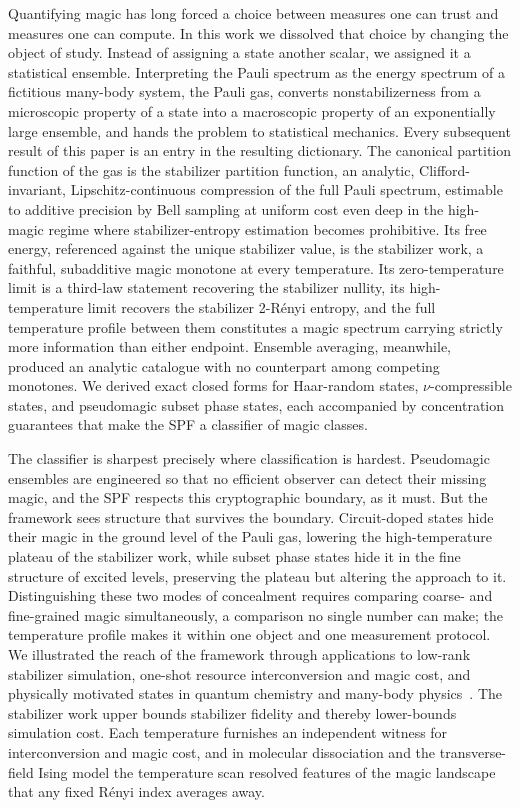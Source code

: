 \documentclass[aps,pra,superscriptaddress,twocolumn,longbibliography]{revtex4-2}
\begin{document}
Quantifying magic has long forced a choice between measures one can trust and measures one can compute. In this work we dissolved that choice by changing the object of study.
Instead of assigning a state another scalar, we assigned it a statistical ensemble. 
Interpreting the Pauli spectrum as the energy spectrum of a fictitious many-body system, the Pauli gas, converts nonstabilizerness from a microscopic property of a state into a macroscopic property of an exponentially large ensemble, and hands the problem to statistical mechanics. 
Every subsequent result of this paper is an entry in the resulting dictionary. The canonical partition function of the gas is the stabilizer partition function, an analytic, Clifford-invariant, Lipschitz-continuous compression of the full Pauli spectrum, estimable to additive precision by Bell sampling at uniform cost even deep in the high-magic regime where stabilizer-entropy estimation becomes prohibitive. Its free energy, referenced against the unique stabilizer value, is the stabilizer work, a faithful, subadditive magic monotone at every temperature. Its zero-temperature limit is a third-law statement recovering the stabilizer nullity, its high-temperature limit recovers the stabilizer 2-R\'enyi entropy, and the full temperature profile between them constitutes a magic spectrum carrying strictly more information than either endpoint. Ensemble averaging, meanwhile, produced an analytic catalogue with no counterpart among competing monotones. We derived exact closed forms for Haar-random states, $\nu$-compressible states, and pseudomagic subset phase states, each accompanied by concentration guarantees that make the SPF a classifier of magic classes.

The classifier is sharpest precisely where classification is hardest.
Pseudomagic ensembles are engineered so that no efficient observer can detect their missing magic, and the SPF respects this cryptographic boundary, as it must.
But the framework sees structure that survives the boundary.
Circuit-doped states hide their magic in the ground level of the Pauli gas, lowering the high-temperature plateau of the stabilizer work, while subset phase states hide it in the fine structure of excited levels, preserving the plateau but altering the approach to it.
Distinguishing these two modes of concealment requires comparing coarse- and fine-grained magic simultaneously, a comparison no single number can make; the temperature profile makes it within one object and one measurement protocol.
We illustrated the reach of the framework through applications to low-rank stabilizer simulation, one-shot resource interconversion and magic cost, and physically motivated states in quantum chemistry and many-body physics~\cite{sarkis2025moleculesmagicalnonstabilizernessmolecular,LiuWinter2022ManyBodyMagic,Oliviero/IsingModelMagic/2022}.
The stabilizer work upper bounds stabilizer fidelity and thereby lower-bounds simulation cost.
Each temperature furnishes an independent witness for interconversion and magic cost, and in molecular dissociation and the transverse-field Ising model the temperature scan resolved features of the magic landscape that any fixed R\'enyi index averages away.
\end{document}

